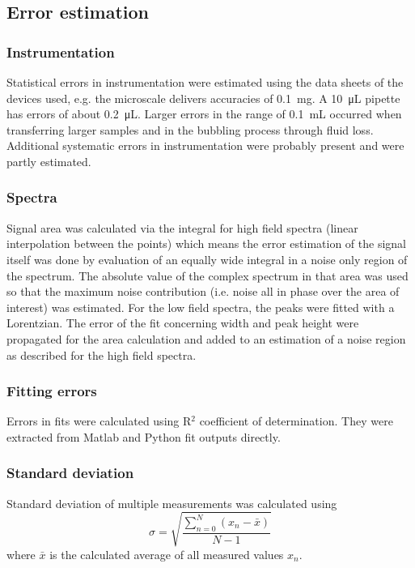     \subsection{Error estimation}
        \subsubsection{Instrumentation}
            Statistical errors in instrumentation were estimated using the data sheets of the devices used, e.g. the microscale delivers accuracies of \SI{0.1}{\milli\gram}. A \SI{10}{\micro\liter} pipette has errors of about \SI{0.2}{\micro\liter}. Larger errors in the range of \SI{0.1}{\milli\liter} occurred when transferring larger samples and in the bubbling process through fluid loss. Additional systematic errors in instrumentation were probably present and were partly estimated.
        \subsubsection{Spectra}
        Signal area was calculated via the integral for high field spectra (linear interpolation between the points) which means the error estimation of the signal itself was done by evaluation of an equally wide integral in a noise only region of the spectrum. The absolute value of the complex spectrum in that area was used so that the maximum noise contribution (i.e. noise all in phase over the area of interest) was estimated.
            For the low field spectra, the peaks were fitted with a Lorentzian. The error of the fit concerning width and peak height were propagated for the area calculation and added to an estimation of a noise region as described for the high field spectra.
        \subsubsection{Fitting errors}
        Errors in fits were calculated using R$^2$ coefficient of determination. They were extracted from Matlab and Python fit outputs directly.
        \subsubsection{Standard deviation}
            Standard deviation of multiple measurements was calculated using
            \begin{equation}
                \sigma=\sqrt{\frac{\sum_{n=0}^N( x_n - \bar x)}{N-1}}
            \end{equation}
            where $\bar x$ is the calculated average of all measured values $x_n$.
